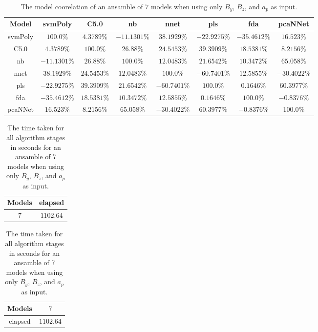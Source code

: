 \begin{table}[!ht]
	\centering
	\begin{tabular}{|c|c|c|c|c|c|c|c|}
		\hline
		Model & svmPoly & C5.0 & nb & nnet & pls & fda & pcaNNet \\ \hline
		svmPoly & $100.0\%$ & $4.3789\%$ & $-11.1301\%$ & $38.1929\%$ & $-22.9275\%$ & $-35.4612\%$ & $16.523\%$ \\ \hline
		C5.0 & $4.3789\%$ & $100.0\%$ & $26.88\%$ & $24.5453\%$ & $39.3909\%$ & $18.5381\%$ & $8.2156\%$ \\ \hline
		nb & $-11.1301\%$ & $26.88\%$ & $100.0\%$ & $12.0483\%$ & $21.6542\%$ & $10.3472\%$ & $65.058\%$ \\ \hline
		nnet & $38.1929\%$ & $24.5453\%$ & $12.0483\%$ & $100.0\%$ & $-60.7401\%$ & $12.5855\%$ & $-30.4022\%$ \\ \hline
		pls & $-22.9275\%$ & $39.3909\%$ & $21.6542\%$ & $-60.7401\%$ & $100.0\%$ & $0.1646\%$ & $60.3977\%$ \\ \hline
		fda & $-35.4612\%$ & $18.5381\%$ & $10.3472\%$ & $12.5855\%$ & $0.1646\%$ & $100.0\%$ & $-0.8376\%$ \\ \hline
		pcaNNet & $16.523\%$ & $8.2156\%$ & $65.058\%$ & $-30.4022\%$ & $60.3977\%$ & $-0.8376\%$ & $100.0\%$ \\ \hline
	\end{tabular}
	\caption{The model coorelation of an ansamble of 7 models when using only $B_{y}$, $B_{z}$, and $a_{p}$ as input.}
	\label{tab:ansamble7:yzap}
\end{table}

\begin{table}[!ht]
	\centering
	\begin{tabular}{|c|c|}
		\hline
		Models & elapsed \\ \hline
		$7$ & $1102.64$ \\ \hline
	\end{tabular}
	\caption{The time taken for all algorithm stages in seconds for an ansamble of 7 models when using only $B_{y}$, $B_{z}$, and $a_{p}$ as input.}
	\label{tab:time:ansamble:yzap:7}
\end{table}

\begin{table}[!ht]
	\centering
	\begin{tabular}{|c|c|}
		\hline
		Models & $7$ \\ \hline
		elapsed & $1102.64$ \\ \hline
	\end{tabular}
	\caption{The time taken for all algorithm stages in seconds for an ansamble of 7 models when using only $B_{y}$, $B_{z}$, and $a_{p}$ as input.}
	\label{tab:time:ansamble:reverse:yzap:7}
\end{table}


